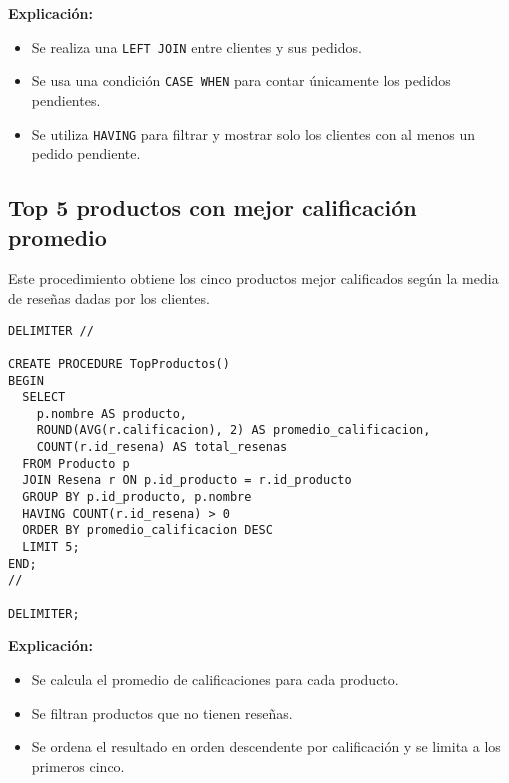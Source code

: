 \textbf{Explicación:}
\begin{itemize}
  \item Se realiza una \texttt{LEFT JOIN} entre clientes y sus pedidos.
  \item Se usa una condición \texttt{CASE WHEN} para contar únicamente los pedidos pendientes.
  \item Se utiliza \texttt{HAVING} para filtrar y mostrar solo los clientes con al menos un pedido pendiente.
\end{itemize}

\subsection{Top 5 productos con mejor calificación promedio}

Este procedimiento obtiene los cinco productos mejor calificados según la media de reseñas dadas por los clientes.

\begin{lstlisting}
DELIMITER //

CREATE PROCEDURE TopProductos()
BEGIN
  SELECT 
    p.nombre AS producto,
    ROUND(AVG(r.calificacion), 2) AS promedio_calificacion,
    COUNT(r.id_resena) AS total_resenas
  FROM Producto p
  JOIN Resena r ON p.id_producto = r.id_producto
  GROUP BY p.id_producto, p.nombre
  HAVING COUNT(r.id_resena) > 0
  ORDER BY promedio_calificacion DESC
  LIMIT 5;
END;
//

DELIMITER;
\end{lstlisting}

\textbf{Explicación:}
\begin{itemize}
  \item Se calcula el promedio de calificaciones para cada producto.
  \item Se filtran productos que no tienen reseñas.
  \item Se ordena el resultado en orden descendente por calificación y se limita a los primeros cinco.
\end{itemize}

\newpage
